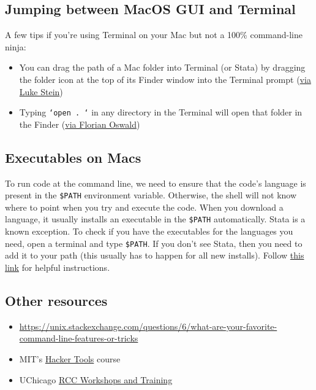 \subsection{Jumping between MacOS GUI and Terminal}

A few tips if you're using Terminal on your Mac but not a 100\% command-line ninja:
\begin{itemize}
	\item You can drag the path of a Mac folder into Terminal (or Stata) by dragging the folder icon at the top of its Finder window into the Terminal prompt (\href{https://twitter.com/lukestein/status/1179792864630296578}{via Luke Stein})
	\item Typing \texttt{`open . `} in any directory in the Terminal will open that folder in the Finder (\href{https://twitter.com/FlorianOswald/status/1179779138892292096}{via Florian Oswald})
\end{itemize}

\subsection{Executables on Macs}
To run code at the command line, we need to ensure that the code's language is present in the \texttt{\$PATH} environment variable.
Otherwise, the shell will not know where to point when you try and execute the code. 
When you download a language, it usually installs an executable in the \texttt{\$PATH} automatically.
Stata is a known exception. 
To check if you have the executables for the languages you need, open a terminal and type \texttt{\$PATH}.
If you don't see Stata, then you need to add it to your path (this usually has to happen for all new installs).
Follow \href{https://datacarpentry.org/stata-economics/setup.html}{this link} for helpful instructions. 

\subsection{Other resources}

\begin{itemize}
	\item \url{https://unix.stackexchange.com/questions/6/what-are-your-favorite-command-line-features-or-tricks}
	\item MIT's \href{https://hacker-tools.github.io/}{Hacker Tools} course
	\item UChicago \href{https://rcc.uchicago.edu/support-and-services/workshops-and-training}{RCC Workshops and Training}
\end{itemize}
